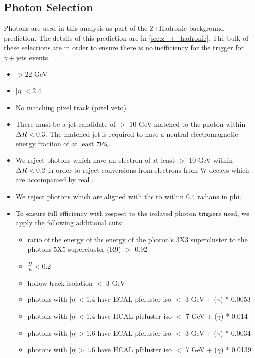 
\newpage

  \subsection{Photon Selection} \label{sec:photon_selection}

    Photons are used in this analysis as part of the Z+Hadronic background prediction. The details of this prediction are in \ref{sec:z_+_hadronic}. The bulk of these selections are in order to ensure there is no inefficiency for the trigger for $\gamma +$jets events. 

    \begin{itemize}
      \item \pt $ > 22$ GeV
      \item $|\eta| < 2.4$
      \item No matching pixel track (pixel veto)
      \item There must be a jet candidate of \pt $ >$ 10 GeV matched to the photon within $\Delta R < 0.3$. 
      The matched jet is required to have a neutral electromagnetic energy fraction of at least 70\%.

      \item We reject photons which have an electron of at least \pt $>$ 10 GeV within $\Delta R < 0.2$
      in order to reject conversions from electrons from W decays which are accompanied by real \MET.

      \item We reject photons which are aligned with the \MET to within 0.4 radians in phi.
      \item To ensure full efficiency with respect to the isolated photon triggers used, we apply the following additional cuts:
      \begin{itemize}
        \item ratio of the energy of the energy of the photon's 3X3 supercluster to the photons 5X5 supercluster (R9) $>$ 0.92
        \item $\frac{H}{E} < 0.2$ %
        \item hollow track isolation $<$ 3 GeV
        \item photons with $|\eta| < 1.4$ have ECAL pfcluster iso $<$ 3 GeV + \pt ($\gamma$) * 0.0053
        \item photons with $|\eta| < 1.4$ have HCAL pfcluster iso $<$ 7 GeV + \pt ($\gamma$) * 0.014
        \item photons with $|\eta| > 1.6$ have ECAL pfcluster iso $<$ 3 GeV + \pt ($\gamma$) * 0.0034
        \item photons with $|\eta| > 1.6$ have HCAL pfcluster iso $<$ 7 GeV + \pt ($\gamma$) * 0.0139
      \end{itemize}
    \end{itemize}

